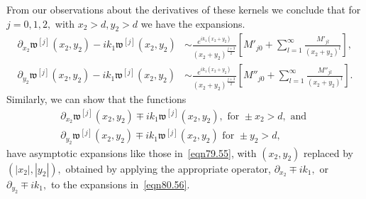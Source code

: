 \documentclass[11pt]{article}
\newcommand\fw{\mathfrak w}
\newcommand\pa{\partial}
\theoremstyle{definition}
\theoremstyle{remark}
\begin{document}
     
  From our observations about the derivatives of these kernels we conclude
     that  for $j=0,1,2,$ with $x_2>d, y_2>d$ we have the expansions.
    \begin{equation}\label{eqn79.55}
      \begin{split}
        \pa_{x_2}\fw^{[j]}(x_2,y_2)-ik_1\fw^{[j]}(x_2,y_2)&\sim \frac{e^{ik_1(x_2+y_2)}}{(x_2+y_2)^{\frac{j+3}{2}}}\left[M'_{j0}+\sum_{l=1}^{\infty}\frac{M'_{jl}}{(x_2+y_2)^l}\right],
      \\
       \pa_{y_2}\fw^{[j]}(x_2,y_2)-ik_1\fw^{[j]}(x_2,y_2)&\sim \frac{e^{ik_1(x_2+y_2)}}{(x_2+y_2)^{\frac{j+3}{2}}}\left[M''_{j0}+\sum_{l=1}^{\infty}
         \frac{M''_{jl}}{(x_2+y_2)^l}\right].
        \end{split}
    \end{equation}
  Similarly, we can show that the functions
   \begin{multline}
             \pa_{x_2}\fw^{[j]}(x_2,y_2)\mp  ik_1\fw^{[j]}(x_2,y_2),
        \text{  for }\pm x_2>d,\text{ and }\\
          \pa_{y_2}\fw^{[j]}(x_2,y_2)\mp
          ik_1\fw^{[j]}(x_2,y_2)\text{ for }\pm y_2>d,
        \end{multline}
have asymptotic expansions like those in~\eqref{eqn79.55}, with $(x_2,y_2)$
replaced by $(|x_2|,|y_2|),$ obtained by applying the appropriate operator,
$\pa_{x_2}\mp ik_1,$ or $\pa_{y_2}\mp ik_1,$ to the expansions
in~\eqref{eqn80.56}.
\end{document}
